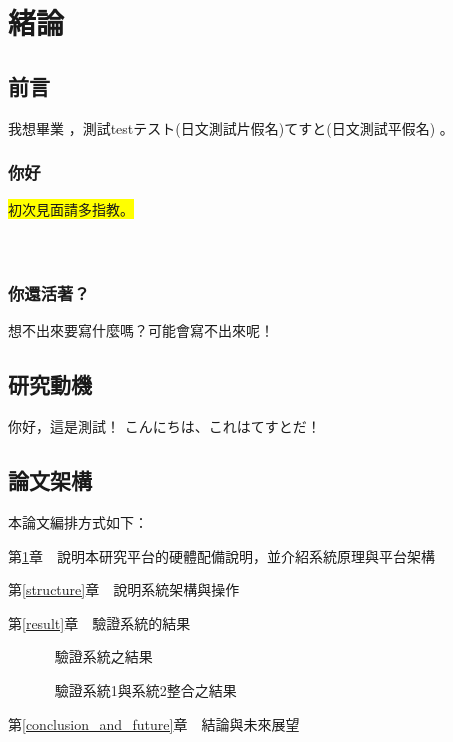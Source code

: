 \chapter{緒論}\label{explanation}


\section{前言}\label{1-1}
我想畢業 \cite{m1}，測試testテスト(日文測試片假名)てすと(日文測試平假名)\cite{talbot97} 。

\subsection{你好}
\colorbox{yellow}{初次見面請多指教。} \\
\color{blue}{初めまして、よろしくお願いします！} \\
 \\
\color{black}

\subsection{你還活著？}
想不出來要寫什麼嗎？可能會寫不出來呢！\cite{goossens97}

\newpage

\section{研究動機}\label{1-2}
你好，這是測試！
こんにちは、これはてすとだ！

\newpage

\section{論文架構}\label{1-3}

\n 本論文編排方式如下：

第\ref{explanation}章　說明本研究平台的硬體配備說明，並介紹系統原理與平台架構

第\ref{structure}章　說明系統架構與操作

第\ref{result}章　驗證系統的結果
		
　　　      驗證系統之結果

　　　      驗證系統1與系統2整合之結果

第\ref{conclusion_and_future}章　結論與未來展望

